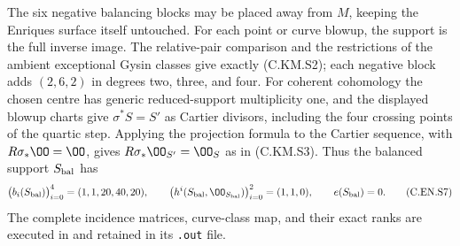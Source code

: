 The six negative balancing blocks may be placed away from
$M$, keeping the Enriques surface itself untouched. For
each point or curve blowup, the support is the full inverse
image. The relative-pair comparison and the restrictions
of the ambient exceptional Gysin classes give exactly
(C.KM.S2); each negative block adds $(2,6,2)$ in degrees
two, three, and four. For coherent cohomology the chosen
centre has generic reduced-support multiplicity one, and
the displayed blowup charts give $\sigma^*S=S'$ as
Cartier divisors, including the four crossing points of
the quartic step. Applying the projection formula to the
Cartier sequence, with $R\sigma_*\OO=\OO$, gives
$R\sigma_*\OO_{S'}=\OO_S$ as in (C.KM.S3).
Thus the balanced support $S_{\rm bal}$ has
\[
 \bigl(b_i(S_{\rm bal})\bigr)_{i=0}^4=(1,1,20,40,20),
 \qquad
 \bigl(h^i(S_{\rm bal},\OO_{S_{\rm bal}})\bigr)_{i=0}^2
       =(1,1,0),\qquad e(S_{\rm bal})=0.                 \tag{C.EN.S7}
\]
The complete incidence matrices, curve-class map, and
their exact ranks are executed in
 and retained in its
\texttt{.out} file.
